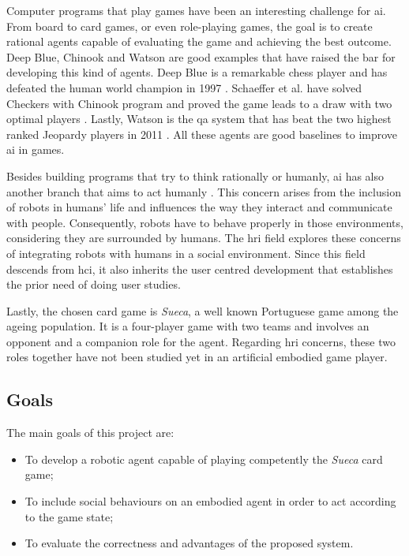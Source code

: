 Computer programs that play games have been an interesting challenge for \ac{ai}.
From board to card games, or even role-playing games, the goal is to create rational agents capable of evaluating the game and achieving the best outcome.
Deep Blue, Chinook and Watson are good examples that have raised the bar for developing this kind of agents.
Deep Blue is a remarkable chess player and has defeated the human world champion in 1997 \cite{Campbell2002}.
Schaeffer et al. have solved Checkers with Chinook program and proved the game leads to a draw with two optimal players \cite{Schaeffer1996}.
Lastly, Watson is the \ac{qa} system that has beat the two highest ranked Jeopardy players in 2011 \cite{Ferrucci2010}.
All these agents are good baselines to improve \ac{ai} in games.


Besides building programs that try to think rationally or humanly, \ac{ai} has also another branch that aims to act humanly \cite{Russell2009}.
This concern arises from the inclusion of robots in humans' life and influences the way they interact and communicate with people.
Consequently, robots have to behave properly in those environments, considering they are surrounded by humans.
The \ac{hri} field explores these concerns of integrating robots with humans in a social environment.
Since this field descends from \ac{hci}, it also inherits the user centred development that establishes the prior need of doing user studies.





Lastly, the chosen card game is \emph{Sueca}, a well known Portuguese game among the ageing population.
It is a four-player game with two teams and involves an opponent and a companion role for the agent.
Regarding \ac{hri} concerns, these two roles together have not been studied yet in an artificial embodied game player.



\subsection{Goals}
\label{sec:goals}

The main goals of this project are:
\begin{itemize}
\item To develop a robotic agent capable of playing competently the \emph{Sueca} card game;
\item To include social behaviours on an embodied agent in order to act according to the game state;
\item To evaluate the correctness and advantages of the proposed system.
\end{itemize}

